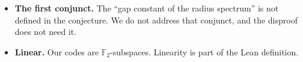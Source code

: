 \documentclass[11pt]{article}
\theoremstyle{definition}
\theoremstyle{remark}
\newcommand{\F}{\mathbb{F}_2}
\begin{document}
\begin{itemize}
by Definition~\ref{def:uniform}, Theorem~\ref{thm:uniform} and
Corollary~\ref{cor:uniform}. In Lean, the even-weight family carries the
refutation (\texttt{EW\_shellUniform}, \texttt{UQP\_spectrum},
\texttt{conjecture\_00000007964\_false\_uniform}). The nontrivial uniform
families $\mathrm{SH}(2^m-2)$ ($d=3$) and $\mathrm{EH}(m)$ ($d=4$) are proved
uniform in the report and checked by \texttt{verify.py}. Weaker variants that
constrain only some shells are implied.
\item \textbf{The first conjunct.} The ``gap constant of the radius spectrum''
is not defined in the conjecture. We do not address that conjunct, and the
disproof does not need it.
\item \textbf{Linear.} Our codes are $\F$-subspaces. Linearity is part of the
Lean definition.
\end{itemize}
\end{document}
